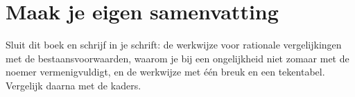 \begin{oefeningen}


\end{oefeningen}


\begin{oefeningen}





\end{oefeningen}


\ifzelfstudie
\section*{Maak je eigen samenvatting}
Sluit dit boek en schrijf in je schrift: de werkwijze voor rationale vergelijkingen met de bestaansvoorwaarden, waarom je bij een ongelijkheid niet zomaar met de noemer vermenigvuldigt, en de werkwijze met één breuk en een tekentabel. Vergelijk daarna met de kaders.
\fi
